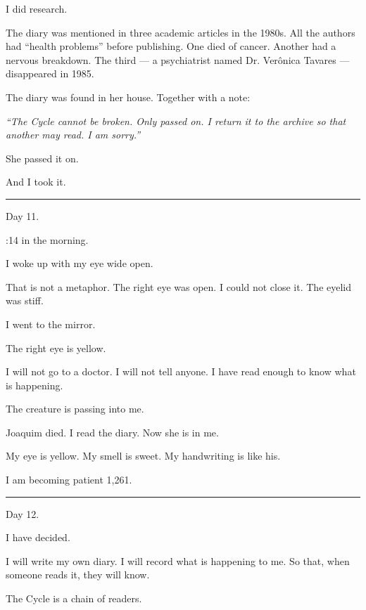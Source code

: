 \noindent I did research.

\noindent The diary was mentioned in three academic articles in the 1980s. All the authors had \textquotedblleft{}health problems\textquotedblright{} before publishing. One died of cancer. Another had a nervous breakdown. The third --- a psychiatrist named Dr. Verônica Tavares --- disappeared in 1985.

\noindent The diary was found in her house. Together with a note:

\noindent \textit{\textquotedblleft{}The Cycle cannot be broken. Only passed on. I return it to the archive so that another may read. I am sorry.\textquotedblright{}}

\noindent She passed it on.

\noindent And I took it.

\vspace{0.5em}\noindent\rule{\textwidth}{0.5pt}\vspace{0.5em}

\noindent Day 11.

:14 in the morning.

\noindent I woke up with my eye wide open.

\noindent That is not a metaphor. The right eye was open. I could not close it. The eyelid was stiff.

\noindent I went to the mirror.

\noindent The right eye is yellow.

\noindent I will not go to a doctor. I will not tell anyone. I have read enough to know what is happening.

\noindent The creature is passing into me.

\noindent Joaquim died.
I read the diary.
Now she is in me.

\noindent My eye is yellow.
My smell is sweet.
My handwriting is like his.

\noindent I am becoming patient 1,261.

\vspace{0.5em}\noindent\rule{\textwidth}{0.5pt}\vspace{0.5em}

\noindent Day 12.

\noindent I have decided.

\noindent I will write my own diary. I will record what is happening to me. So that, when someone reads it, they will know.

\noindent The Cycle is a chain of readers.

